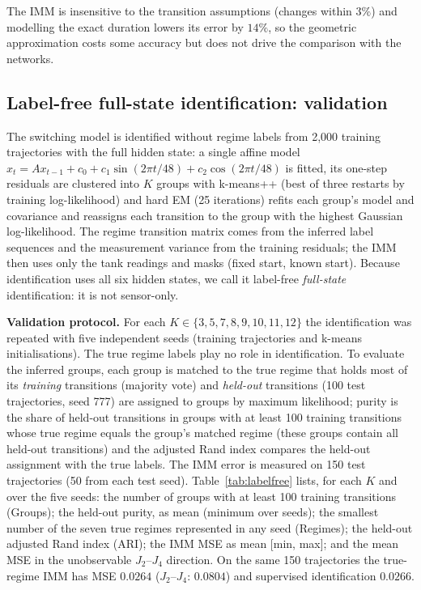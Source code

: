 \documentclass[conference]{IEEEtran}
\begin{document}
The IMM is insensitive to the transition assumptions (changes within $3\%$) and modelling the exact duration lowers its error by $14\%$, so the geometric approximation costs some accuracy but does not drive the comparison with the networks.

\subsection*{Label-free full-state identification: validation}
The switching model is identified without regime labels from 2,000 training trajectories with the full hidden state: a single affine model $x_t=Ax_{t-1}+c_0+c_1\sin(2\pi t/48)+c_2\cos(2\pi t/48)$ is fitted, its one-step residuals are clustered into $K$ groups with k-means++ (best of three restarts by training log-likelihood) and hard EM (25 iterations) refits each group's model and covariance and reassigns each transition to the group with the highest Gaussian log-likelihood. The regime transition matrix comes from the inferred label sequences and the measurement variance from the training residuals; the IMM then uses only the tank readings and masks (fixed start, known start). Because identification uses all six hidden states, we call it label-free \emph{full-state} identification: it is not sensor-only.

\textbf{Validation protocol.} For each $K\in\{3,5,7,8,9,10,11,12\}$ the identification was repeated with five independent seeds (training trajectories and k-means initialisations). The true regime labels play no role in identification. To evaluate the inferred groups, each group is matched to the true regime that holds most of its \emph{training} transitions (majority vote) and \emph{held-out} transitions (100 test trajectories, seed 777) are assigned to groups by maximum likelihood; purity is the share of held-out transitions in groups with at least 100 training transitions whose true regime equals the group's matched regime (these groups contain all held-out transitions) and the adjusted Rand index compares the held-out assignment with the true labels. The IMM error is measured on 150 test trajectories (50 from each test seed). Table~\ref{tab:labelfree} lists, for each $K$ and over the five seeds: the number of groups with at least 100 training transitions (Groups); the held-out purity, as mean (minimum over seeds); the smallest number of the seven true regimes represented in any seed (Regimes); the held-out adjusted Rand index (ARI); the IMM MSE as mean [min, max]; and the mean MSE in the unobservable $J_2$--$J_4$ direction. On the same 150 trajectories the true-regime IMM has MSE $0.0264$ ($J_2$--$J_4$: $0.0804$) and supervised identification $0.0266$.
\end{document}
